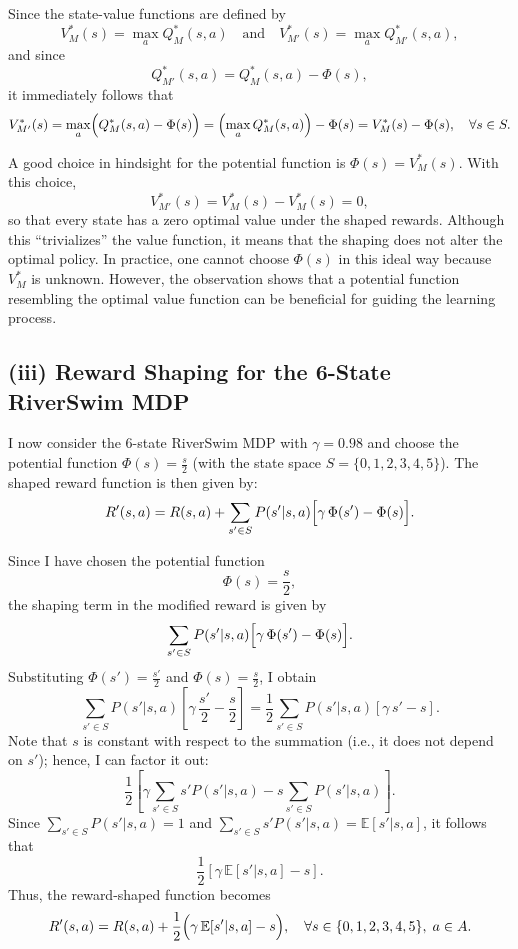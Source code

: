 Since the state-value functions are defined by
\[
V^*_M(s)=\max_{a} Q^*_M(s,a)
\quad \text{and} \quad 
V^*_{M'}(s)=\max_{a} Q^*_{M'}(s,a),
\]
and since
\[
Q^*_{M'}(s,a)=Q^*_M(s,a)-\Phi(s),
\]
it immediately follows that
\[
V^*_{M'}(s)=\max_{a}\Bigl(Q^*_M(s,a)-\Phi(s)\Bigr)
= \Bigl(\max_{a} Q^*_M(s,a)\Bigr)-\Phi(s)
= V^*_M(s)-\Phi(s),\quad \forall s\in S.
\]

A good choice in hindsight for the potential function is \(\Phi(s)=V^*_M(s)\). With this choice,
\[
V^*_{M'}(s)=V^*_M(s)-V^*_M(s)=0,
\]
so that every state has a zero optimal value under the shaped rewards. Although this “trivializes” the value 
function, it means that the shaping does not alter the optimal policy. In practice, one cannot choose \(\Phi(s)\)
in this ideal way because \(V^*_M\) is unknown. However, the observation shows that a potential function resembling 
the optimal value function can be beneficial for guiding the learning process.

\subsection*{(iii) Reward Shaping for the 6-State RiverSwim MDP}

I now consider the 6-state RiverSwim MDP with \(\gamma=0.98\) and choose the potential function 
\(\Phi(s)=\frac{s}{2}\) (with the state space \(S=\{0,1,2,3,4,5\}\)). The shaped reward function is then given by:
\[
R'(s,a)=R(s,a)+\sum_{s'\in S}P(s'|s,a)\Bigl[\gamma\,\Phi(s')-\Phi(s)\Bigr].
\]

Since I have chosen the potential function
\[
\Phi(s)=\frac{s}{2},
\]
the shaping term in the modified reward is given by
\[
\sum_{s'\in S}P(s'|s,a)\Bigl[\gamma\,\Phi(s')-\Phi(s)\Bigr].
\]
Substituting \(\Phi(s')=\frac{s'}{2}\) and \(\Phi(s)=\frac{s}{2}\), I obtain
\[
\sum_{s'\in S}P(s'|s,a)\left[\gamma\,\frac{s'}{2}-\frac{s}{2}\right]
=\frac{1}{2}\sum_{s'\in S}P(s'|s,a)\left[\gamma\,s'-s\right].
\]
Note that \(s\) is constant with respect to the summation (i.e., it does not depend on \(s'\)); hence, I can factor it out:
\[
\frac{1}{2}\left[\gamma\sum_{s'\in S}s'P(s'|s,a)-s\sum_{s'\in S}P(s'|s,a)\right].
\]
Since \(\sum_{s'\in S}P(s'|s,a)=1\) and \(\sum_{s'\in S}s'P(s'|s,a)=\mathbb{E}[s'|s,a]\), it follows that
\[
\frac{1}{2}\left[\gamma\,\mathbb{E}[s'|s,a]-s\right].
\]
Thus, the reward-shaped function becomes
\[
R'(s,a)=R(s,a)+\frac{1}{2}\Bigl(\gamma\,\mathbb{E}[s'|s,a]-s\Bigr), \quad \forall s\in \{0,1,2,3,4,5\},\; a\in A.
\]